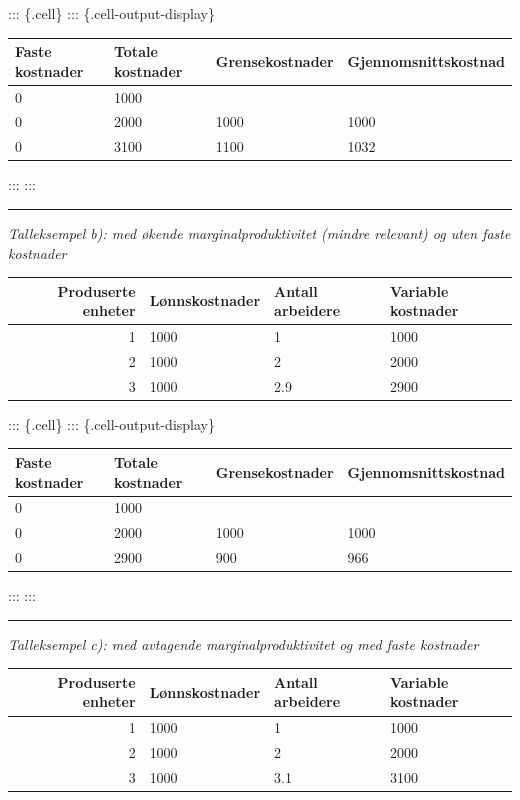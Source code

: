 \documentclass[
  letterpaper,
  DIV=11,
  numbers=noendperiod]{scrartcl}
\begin{document}
::: \{.cell\} ::: \{.cell-output-display\}

\begin{tabular}[t]{l|l|l|l}
\hline
Faste kostnader & Totale kostnader & Grensekostnader & Gjennomsnittskostnad\\
\hline
0 & 1000 &  & \\
\hline
0 & 2000 & 1000 & 1000\\
\hline
0 & 3100 & 1100 & 1032\\
\hline
\end{tabular}

::: :::

\begin{center}\rule{0.5\linewidth}{0.5pt}\end{center}

\emph{Talleksempel b): med økende marginalproduktivitet (mindre
relevant) og uten faste kostnader}

\begin{tabular}[t]{r|l|l|l}
\hline
Produserte enheter & Lønnskostnader & Antall arbeidere & Variable kostnader\\
\hline
1 & 1000 & 1 & 1000\\
\hline
2 & 1000 & 2 & 2000\\
\hline
3 & 1000 & 2.9 & 2900\\
\hline
\end{tabular}

::: \{.cell\} ::: \{.cell-output-display\}

\begin{tabular}[t]{l|l|l|l}
\hline
Faste kostnader & Totale kostnader & Grensekostnader & Gjennomsnittskostnad\\
\hline
0 & 1000 &  & \\
\hline
0 & 2000 & 1000 & 1000\\
\hline
0 & 2900 & 900 & 966\\
\hline
\end{tabular}

::: :::

\begin{center}\rule{0.5\linewidth}{0.5pt}\end{center}

\emph{Talleksempel c): med avtagende marginalproduktivitet og med faste
kostnader}

\begin{tabular}[t]{r|l|l|l}
\hline
Produserte enheter & Lønnskostnader & Antall arbeidere & Variable kostnader\\
\hline
1 & 1000 & 1 & 1000\\
\hline
2 & 1000 & 2 & 2000\\
\hline
3 & 1000 & 3.1 & 3100\\
\hline
\end{tabular}
\end{document}
